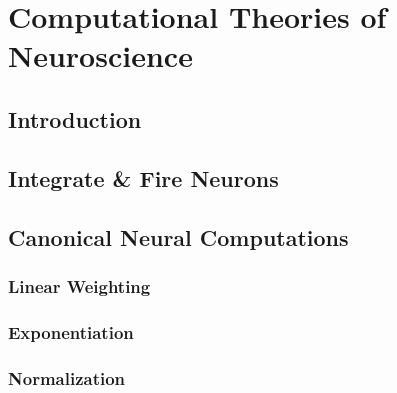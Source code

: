 \chapter{Computational Theories of Neuroscience}
\label{chap: computational theories of neuroscience}

\section{Introduction}


\section{Integrate \& Fire Neurons}



\section{Canonical Neural Computations}

\subsection{Linear Weighting}


\subsection{Exponentiation}


\subsection{Normalization}

